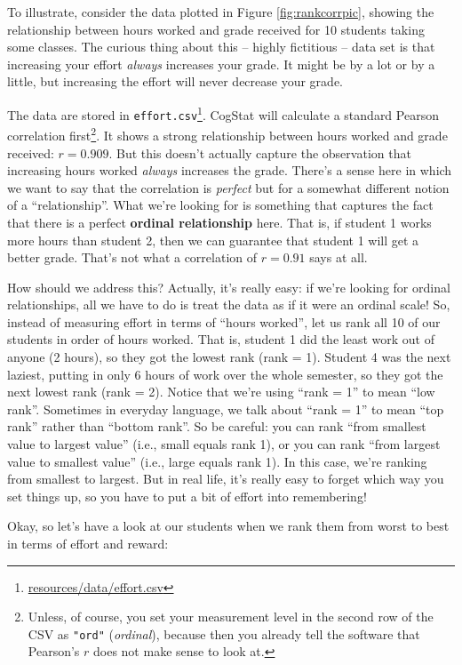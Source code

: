 \documentclass[
  11pt,
  a4paper,
  twoside,symmetric,openright]{book}
\theoremstyle{break}
\theoremstyle{break}
\DeclareRobustCommand{\href}[2]{#2\footnote{\url{#1}}}
\begin{document}
To illustrate, consider the data plotted in Figure \ref{fig:rankcorrpic}, showing the relationship between hours worked and grade received for 10 students taking some classes. The curious thing about this -- highly fictitious -- data set is that increasing your effort \emph{always} increases your grade. It might be by a lot or by a little, but increasing the effort will never decrease your grade.

The data are stored in \href{resources/data/effort.csv}{\texttt{effort.csv}}. CogStat will calculate a standard Pearson correlation first\footnote{Unless, of course, you set your measurement level in the second row of the CSV as \texttt{"ord"} (\emph{ordinal}), because then you already tell the software that Pearson's \(r\) does not make sense to look at.}. It shows a strong relationship between hours worked and grade received: \(r = 0.909\). But this doesn't actually capture the observation that increasing hours worked \emph{always} increases the grade. There's a sense here in which we want to say that the correlation is \emph{perfect} but for a somewhat different notion of a ``relationship''. What we're looking for is something that captures the fact that there is a perfect \textbf{ordinal relationship} here. That is, if student 1 works more hours than student 2, then we can guarantee that student 1 will get a better grade. That's not what a correlation of \(r = 0.91\) says at all.

How should we address this? Actually, it's really easy: if we're looking for ordinal relationships, all we have to do is treat the data as if it were an ordinal scale! So, instead of measuring effort in terms of ``hours worked'', let us rank all 10 of our students in order of hours worked. That is, student 1 did the least work out of anyone (2 hours), so they got the lowest rank (rank = 1). Student 4 was the next laziest, putting in only 6 hours of work over the whole semester, so they got the next lowest rank (rank = 2). Notice that we're using ``rank = 1'' to mean ``low rank''. Sometimes in everyday language, we talk about ``rank = 1'' to mean ``top rank'' rather than ``bottom rank''. So be careful: you can rank ``from smallest value to largest value'' (i.e., small equals rank 1), or you can rank ``from largest value to smallest value'' (i.e., large equals rank 1). In this case, we're ranking from smallest to largest. But in real life, it's really easy to forget which way you set things up, so you have to put a bit of effort into remembering!

Okay, so let's have a look at our students when we rank them from worst to best in terms of effort and reward:
\end{document}
